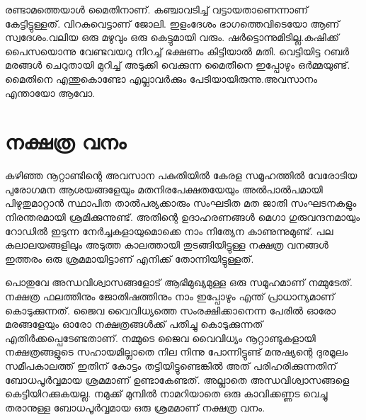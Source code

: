 \documentclass[10pt,a4paper]{report}
\begin{document}
 രണ്ടാമത്തെയാൾ മൈതിനാണ്. കഞ്ചാവടിച്ച് വട്ടായതാണെന്നാണ് കേട്ടിട്ടുള്ളത്. വിറകുവെട്ടാണ് ജോലി. ഇളംദേശം ഭാഗത്തെവിടെയോ ആണ് സ്വദേശം.വലിയ ഒരു മഴുവും ഒരു കെട്ടുമായി വരും. ഷർട്ടൊന്നുമിടില്ല.കഷിക്ക് പൈസയൊന്നു വേണ്ടവയറു നിറച്ച് ഭക്ഷണം കിട്ടിയാൽ മതി. വെട്ടിയിട്ട റബർ മരങ്ങൾ ചെറുതായി മുറിച്ച് അടുക്കി വെക്കുന്ന മൈതീനെ ഇപ്പോഴും ഒർമ്മയുണ്ട്. മൈതിനെ എന്തുകൊണ്ടോ എല്ലാവർക്കും പേടിയായിരുന്നു.അവസാനം എന്തായോ ആവോ.


\section{നക്ഷത്ര വനം}
കഴിഞ്ഞ നൂറ്റാണ്ടിന്റെ അവസാന പകുതിയിൽ കേരള സമൂഹത്തിൽ വേരോടിയ പുരോഗമന ആശയങ്ങളേയും മതനിരപേക്ഷതയേയും അൽപാൽപമായി പിഴുതുമാറ്റാൻ സ്ഥാപിത താൽപര്യക്കാരും സംഘടിത മത ജാതി സംഘടനകളും നിരന്തരമായി ശ്രമിക്കുന്നുണ്ട്. അതിന്റെ ഉദാഹരണങ്ങൾ മെഗാ ഗുരുവന്ദനമായും റോഡിൽ ഇടുന്ന നേർച്ചകളായുമൊക്കെ നാം നിത്യേന കാണുന്നുമുണ്ട്. പല കലാലയങ്ങളിലും അടുത്ത കാലത്തായി തുടങ്ങിയിട്ടുള്ള നക്ഷത്ര വനങ്ങൾ ഇത്തരം ഒരു ശ്രമമായിട്ടാണ് എനിക്ക് തോന്നിയിട്ടുള്ളത്.

പൊതുവേ അന്ധവിശ്വാസങ്ങളോട് ആഭിമുഖ്യമുള്ള ഒരു സമൂഹമാണ് നമ്മുടേത്. നക്ഷത്ര ഫലത്തിനും ജോതിഷത്തിനും നാം ഇപ്പോഴും എന്ത് പ്രാധാന്യമാണ് കൊടുക്കുന്നത്. ജൈവ വൈവിധ്യത്തെ സംരക്ഷിക്കാനെന്ന പേരിൽ ഓരോ മരങ്ങളേയും ഓരോ നക്ഷത്രങ്ങൾക്ക് പതിച്ചു കൊടുക്കുന്നത് എതിർക്കപ്പെടേണ്ടതാണ്. നമ്മുടെ ജൈവ വൈവിധ്യം നൂറ്റാണ്ടുകളായി നക്ഷത്രങ്ങളുടെ സഹായമില്ലാതെ നില നിന്നു പോന്നിട്ടുണ്ട് മനുഷ്യന്റെ ദുരമൂലം സമീപകാലത്ത് ഇതിന് കോട്ടം തട്ടിയിട്ടുണ്ടെങ്കിൽ അത് പരിഹരിക്കുന്നതിന് ബോധപൂർവ്വമായ ശ്രമമാണ് ഉണ്ടാകേണ്ടത്. അല്ലാതെ അന്ധവിശ്വാസങ്ങളെ കെട്ടിയിറക്കുകയല്ല. നമുക്ക് മുമ്പിൽ നാമറിയാതെ ഒരു കാവിക്കണ്ണട വെച്ചു തരാനുള്ള ബോധപൂർവ്വമായ ഒരു ശ്രമമാണ് നക്ഷത്ര വനം.
\end{document}
